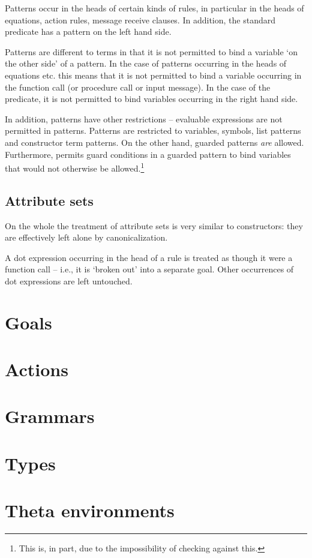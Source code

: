 Patterns occur in the heads of certain kinds of rules, in particular in the heads of equations, action rules, message receive clauses. In addition, the standard \go predicate  has a pattern on the left hand side.

Patterns are different to terms in that it is not permitted to bind a variable `on the other side' of a pattern. In the case of patterns occurring in the heads of equations etc. this means that it is not permitted to bind a variable occurring in the function call (or procedure call or input message). In the case of the  predicate, it is not permitted to bind variables occurring in the right hand side.

In addition, patterns have other restrictions -- evaluable expressions are not permitted in patterns. Patterns are restricted to variables, symbols, list patterns and constructor term patterns. On the other hand, \q{::} guarded patterns \emph{are} allowed. Furthermore, \go permits guard conditions in a guarded pattern to bind variables that would not otherwise be allowed.\footnote{This is, in part, due to the impossibility of checking against this.} 

\subsection{Attribute sets}
\label{canonical:attributes}

On the whole the treatment of attribute sets is very similar to constructors: they are effectively left alone by canonicalization. 

A dot expression occurring in the head of a rule is treated as though it were a function call -- i.e., it is `broken out' into a separate goal. Other occurrences of dot expressions are left untouched.

\section{Goals}
\label{canonical:goals}

\section{Actions}
\label{canonical:actions}

\section{Grammars}
\label{canonical:grammars}

\section{Types}
\label{canonical:types}

\section{Theta environments}
\label{canonical:theta}

